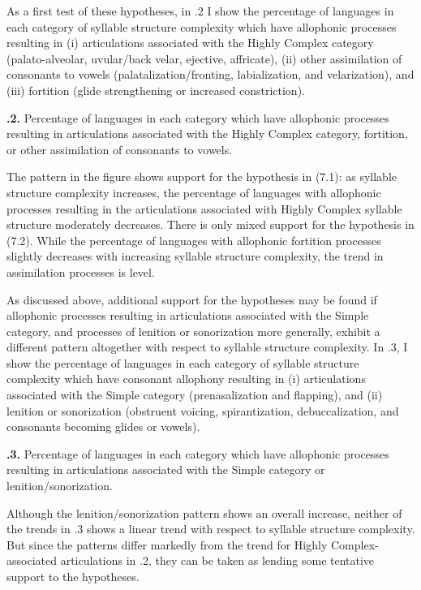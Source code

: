   As a first test of these hypotheses, in .2 I show the percentage of languages in each category of syllable structure complexity which have allophonic processes resulting in (i) articulations associated with the Highly Complex category (palato-alveolar, uvular/back velar, ejective, affricate), (ii) other assimilation of consonants to vowels (palatalization/fronting, labialization, and velarization), and (iii) fortition (glide strengthening or increased constriction).

\textbf{.2.} Percentage of languages in each category which have allophonic processes resulting in articulations associated with the Highly Complex category, fortition, or other assimilation of consonants to vowels.

  The pattern in the figure shows support for the hypothesis in (7.1): as syllable structure complexity increases, the percentage of languages with allophonic processes resulting in the articulations associated with Highly Complex syllable structure moderately decreases. There is only mixed support for the hypothesis in (7.2). While the percentage of languages with allophonic fortition processes slightly decreases with increasing syllable structure complexity, the trend in assimilation processes is level.

  As discussed above, additional support for the hypotheses may be found if allophonic processes resulting in articulations associated with the Simple category, and processes of lenition or sonorization more generally, exhibit a different pattern altogether with respect to syllable structure complexity. In .3, I show the percentage of languages in each category of syllable structure complexity which have consonant allophony resulting in (i) articulations associated with the Simple category (prenasalization and flapping), and (ii) lenition or sonorization (obstruent voicing, spirantization, debuccalization, and consonants becoming glides or vowels).

\textbf{.3.} Percentage of languages in each category which have allophonic processes resulting in articulations associated with the Simple category or lenition/sonorization.

  Although the lenition/sonorization pattern shows an overall increase, neither of the trends in .3 shows a linear trend with respect to syllable structure complexity. But since the patterns differ markedly from the trend for Highly Complex-associated articulations in .2, they can be taken as lending some tentative support to the hypotheses.

